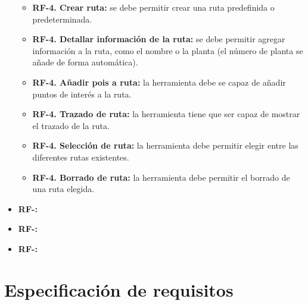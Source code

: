 \begin{itemize}
\begin{itemize}
	\item
	\textbf{RF-4. Crear ruta:} se debe permitir crear una ruta predefinida o predeterminada.
	\item
	\textbf{RF-4. Detallar información de la ruta:} se debe permitir agregar información a la ruta, como el nombre o la planta (el número de planta se añade de forma automática).
	\item
	\textbf{RF-4. Añadir pois a ruta:} la herramienta debe se capaz de añadir puntos de interés a la ruta.
	\item
	\textbf{RF-4. Trazado de ruta:} la herramienta tiene que ser capaz de mostrar el trazado de la ruta.
	\item
	\textbf{RF-4. Selección de ruta:} la herramienta debe permitir elegir entre las diferentes rutas existentes.
	\item
	\textbf{RF-4. Borrado de ruta:} la herramienta debe permitir el borrado de una ruta elegida.
\end{itemize}
\item
\textbf{RF-:}
\item
\textbf{RF-:}
\item
\textbf{RF-:}
\end{itemize}

\section{Especificación de requisitos}


